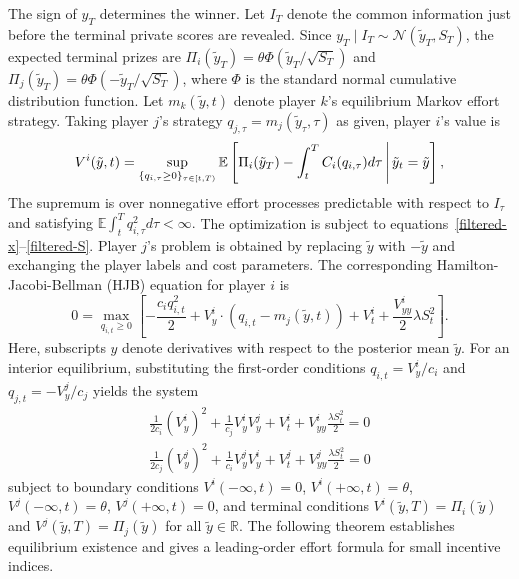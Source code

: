 \documentclass[mnsc]{informs3}
\begin{document}
{
The sign of $y_T$ determines the winner. Let $I_T$ denote the common information just before the terminal private scores are revealed. Since $y_T\mid I_T\sim\mathcal N(\tilde y_T,S_T)$, the expected terminal prizes are $\Pi_i(\tilde y_T)=\theta\Phi(\tilde y_T/\sqrt{S_T})$ and $\Pi_j(\tilde y_T)=\theta\Phi(-\tilde y_T/\sqrt{S_T})$, where $\Phi$ is the standard normal cumulative distribution function.
}
{Let $m_k(\tilde y,t)$ denote player $k$'s equilibrium Markov effort strategy. Taking player $j$'s strategy $q_{j,\tau}=m_j(\tilde y_\tau,\tau)$ as given, player $i$'s value is}
\begin{equation*}
	{\color{black}V^i(\tilde y,t)
	=\sup_{\{q_{i,\tau}\geq0\}_{\tau\in[t,T)}}
	\mathbb{E}\left[
	\Pi_i(\tilde y_T)-\int_t^T C_i(q_{i,\tau})d\tau
	\,\middle|\,\tilde y_t=\tilde y
	\right],}
\end{equation*}
{The supremum is over nonnegative effort processes predictable with respect to $I_\tau$ and satisfying $\mathbb E\int_t^Tq_{i,\tau}^2d\tau<\infty$.} The optimization is subject to equations~\eqref{filtered-x}--\eqref{filtered-S}. Player $j$'s problem is obtained by replacing $\tilde y$ with $-\tilde y$ and exchanging the player labels and cost parameters.
The corresponding Hamilton-Jacobi-Bellman (HJB) equation for player $i$ is
\begin{equation*}
{0 = \max_{q_{i,t}\ge0}\left[-\frac{c_iq_{i,t}^2}{2} + V^i_{y}\cdot\left(q_{i,t}-m_j(\tilde y,t)\right)+V^i_t + \frac{V^i_{yy}}{2}\lambda S_t^2\right].}
\end{equation*}
{Here, subscripts $y$ denote derivatives with respect to the posterior mean $\tilde y$.}
{For an interior equilibrium, substituting the first-order conditions $q_{i,t} = V^i_y/c_i$ and $q_{j,t} = -V^j_y/c_j$ yields the system}
\begin{equation*}
\begin{aligned}
{\frac{1}{2c_i}(V^i_y)^2 + \frac{1}{c_j}V^i_yV^j_y + V^i_t + V^i_{yy}\frac{\lambda S_t^2}{2} = 0}\\
{\frac{1}{2c_j}(V^j_y)^2 + \frac{1}{c_i}V^j_yV^i_y + V^j_t + V^j_{yy}\frac{\lambda S_t^2}{2} = 0}
\end{aligned}
\end{equation*}
subject to boundary conditions
$V^i(-\infty,t)=0$,
$V^i(+\infty,t)=\theta$,
$V^j(-\infty,t)=\theta$,
$V^j(+\infty,t)=0$,
and terminal conditions {$V^i(\tilde y,T)=\Pi_i(\tilde y)$ and $V^j(\tilde y,T)=\Pi_j(\tilde y)$ for all $\tilde y\in\mathbb R$.}
The following theorem establishes equilibrium existence and gives a leading-order effort formula for small incentive indices.
\end{document}
